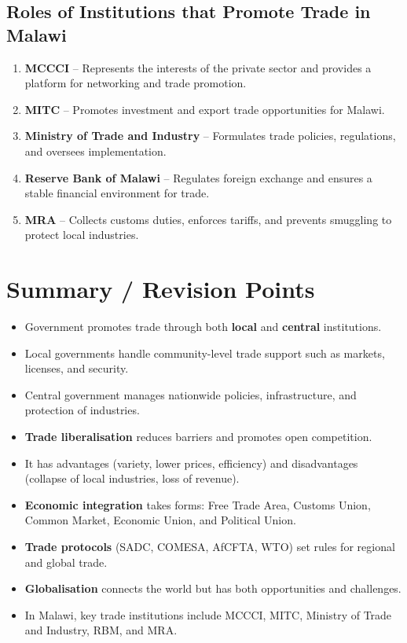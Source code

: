 \documentclass[14pt,a4paper, openany]{book}
\begin{document}
\subsection{Roles of Institutions that Promote Trade in Malawi}
\begin{enumerate}
	\item \textbf{MCCCI} – Represents the interests of the private sector and provides a platform for networking and trade promotion.
	\item \textbf{MITC} – Promotes investment and export trade opportunities for Malawi.
	\item \textbf{Ministry of Trade and Industry} – Formulates trade policies, regulations, and oversees implementation.
	\item \textbf{Reserve Bank of Malawi} – Regulates foreign exchange and ensures a stable financial environment for trade.
	\item \textbf{MRA} – Collects customs duties, enforces tariffs, and prevents smuggling to protect local industries.
\end{enumerate}

\section*{Summary / Revision Points}
\begin{itemize}
	\item Government promotes trade through both \textbf{local} and \textbf{central} institutions.
	\item Local governments handle community-level trade support such as markets, licenses, and security.
	\item Central government manages nationwide policies, infrastructure, and protection of industries.
	\item \textbf{Trade liberalisation} reduces barriers and promotes open competition.
	\item It has advantages (variety, lower prices, efficiency) and disadvantages (collapse of local industries, loss of revenue).
	\item \textbf{Economic integration} takes forms: Free Trade Area, Customs Union, Common Market, Economic Union, and Political Union.
	\item \textbf{Trade protocols} (SADC, COMESA, AfCFTA, WTO) set rules for regional and global trade.
	\item \textbf{Globalisation} connects the world but has both opportunities and challenges.
	\item In Malawi, key trade institutions include MCCCI, MITC, Ministry of Trade and Industry, RBM, and MRA.
\end{itemize}
\end{document}
